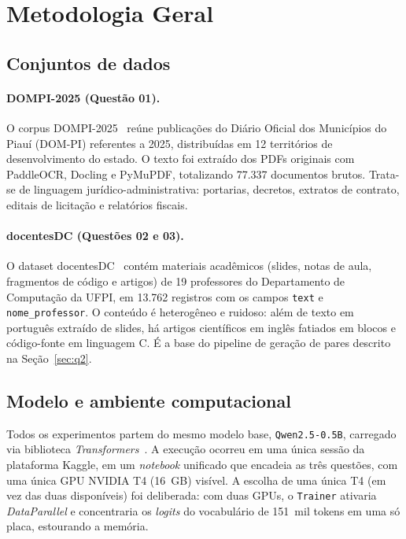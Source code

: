 \section{Metodologia Geral}
\label{sec:metodologia}

\subsection{Conjuntos de dados}

\paragraph{DOMPI-2025 (Questão 01).} O corpus DOMPI-2025~\cite{dataset_dompi2025}
reúne publicações do Diário Oficial dos Municípios do Piauí (DOM-PI) referentes a
2025, distribuídas em 12 territórios de desenvolvimento do estado. O texto foi
extraído dos PDFs originais com PaddleOCR, Docling e PyMuPDF, totalizando 77.337
documentos brutos. Trata-se de linguagem jurídico-administrativa: portarias,
decretos, extratos de contrato, editais de licitação e relatórios fiscais.

\paragraph{docentesDC (Questões 02 e 03).} O dataset
docentesDC~\cite{dataset_docentesdc} contém materiais acadêmicos (slides, notas de
aula, fragmentos de código e artigos) de 19 professores do Departamento de
Computação da UFPI, em 13.762 registros com os campos \texttt{text} e
\texttt{nome\_professor}. O conteúdo é heterogêneo e ruidoso: além de texto em
português extraído de slides, há artigos científicos em inglês fatiados em blocos e
código-fonte em linguagem C. É a base do pipeline de geração de pares descrito na
Seção~\ref{sec:q2}.

\subsection{Modelo e ambiente computacional}

Todos os experimentos partem do mesmo modelo base, \texttt{Qwen2.5-0.5B}, carregado
via biblioteca \textit{Transformers}~\cite{wolf2020transformers}. A execução ocorreu
em uma única sessão da plataforma Kaggle, em um \textit{notebook} unificado que
encadeia as três questões, com uma única GPU NVIDIA T4 (16~GB) visível. A escolha de
uma única T4 (em vez das duas disponíveis) foi deliberada: com duas GPUs, o
\texttt{Trainer} ativaria \textit{DataParallel} e concentraria os \textit{logits} do
vocabulário de 151~mil tokens em uma só placa, estourando a memória.

